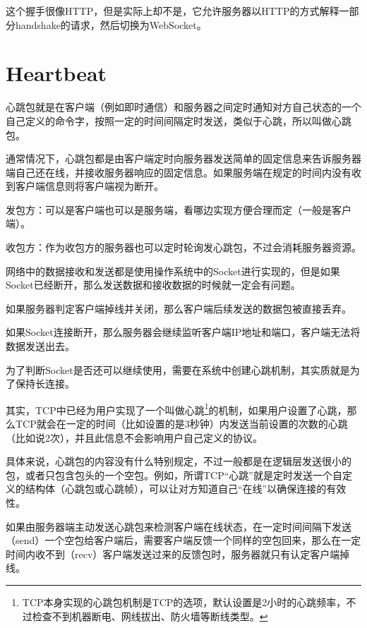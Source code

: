 这个握手很像HTTP，但是实际上却不是，它允许服务器以HTTP的方式解释一部分handshake的请求，然后切换为WebSocket。


\section{Heartbeat}


心跳包就是在客户端（例如即时通信）和服务器之间定时通知对方自己状态的一个自己定义的命令字，按照一定的时间间隔定时发送，类似于心跳，所以叫做心跳包。



通常情况下，心跳包都是由客户端定时向服务器发送简单的固定信息来告诉服务器端自己还在线，并接收服务器响应的固定信息。如果服务端在规定的时间内没有收到客户端信息则将客户端视为断开。

\begin{compactitem}
\item 发包方：可以是客户端也可以是服务端，看哪边实现方便合理而定（一般是客户端）。
\item 收包方：作为收包方的服务器也可以定时轮询发心跳包，不过会消耗服务器资源。
\end{compactitem}

网络中的数据接收和发送都是使用操作系统中的Socket进行实现的，但是如果Socket已经断开，那么发送数据和接收数据的时候就一定会有问题。

\begin{compactitem}
\item 如果服务器判定客户端掉线并关闭，那么客户端后续发送的数据包被直接丢弃。
\item 如果Socket连接断开，那么服务器会继续监听客户端IP地址和端口，客户端无法将数据发送出去。
\end{compactitem}

为了判断Socket是否还可以继续使用，需要在系统中创建心跳机制，其实质就是为了保持长连接。


其实，TCP中已经为用户实现了一个叫做心跳\footnote{TCP本身实现的心跳包机制是TCP的选项，默认设置是2小时的心跳频率，不过检查不到机器断电、网线拔出、防火墙等断线类型。}的机制，如果用户设置了心跳，那么TCP就会在一定的时间（比如设置的是3秒钟）内发送当前设置的次数的心跳（比如说2次），并且此信息不会影响用户自己定义的协议。



具体来说，心跳包的内容没有什么特别规定，不过一般都是在逻辑层发送很小的包，或者只包含包头的一个空包。例如，所谓TCP“心跳”就是定时发送一个自定义的结构体（心跳包或心跳帧），可以让对方知道自己“在线”以确保连接的有效性。


如果由服务器端主动发送心跳包来检测客户端在线状态，在一定时间间隔下发送（send）一个空包给客户端后，需要客户端反馈一个同样的空包回来，那么在一定时间内收不到（recv）客户端发送过来的反馈包时，服务器就只有认定客户端掉线。

